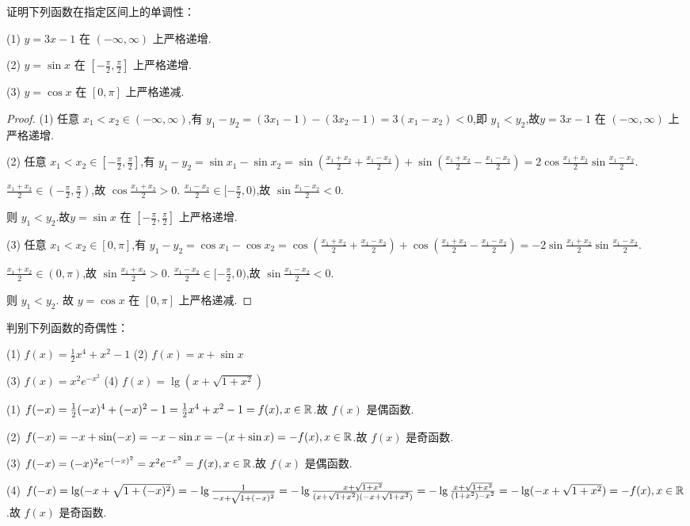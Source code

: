 \begin{practice}
    证明下列函数在指定区间上的单调性：

    (1) $y=3x-1$ 在 $(-\infty,\infty)$ 上严格递增.

    (2) $y=\sin x$ 在 $[-\frac{\pi}{2},\frac{\pi}{2}]$ 上严格递增.

    (3) $y=\cos x$ 在 $[0,\pi]$ 上严格递减.
\end{practice}

\begin{proof}
    (1) 任意 $x_1<x_2\in (-\infty,\infty)$,有 $y_1-y_2=(3x_1-1)-(3x_2-1)=3(x_1-x_2)<0$,即 $y_1<y_2$,故$y=3x-1$ 在 $(-\infty,\infty)$ 上严格递增.

    (2) 任意 $x_1<x_2\in [-\frac{\pi}{2},\frac{\pi}{2}]$,有 $y_1-y_2=\sin x_1-\sin x_2=\sin (\frac{x_1+x_2}{2}+\frac{x_1-x_2}{2})+\sin (\frac{x_1+x_2}{2}-\frac{x_1-x_2}{2})=2 \cos \frac{x_1+x_2}{2}\sin \frac{x_1-x_2}{2}$.
    
    $\frac{x_1+x_2}{2}\in (-\frac{\pi}{2},\frac{\pi}{2})$,故 $\cos \frac{x_1+x_2}{2}>0$. $\frac{x_1-x_2}{2}\in [-\frac{\pi}{2},0)$,故 $\sin \frac{x_1-x_2}{2}<0$. 

    则 $y_1<y_2$.故$y=\sin x$ 在 $[-\frac{\pi}{2},\frac{\pi}{2}]$ 上严格递增.
    
    (3) 任意 $x_1<x_2\in [0,\pi]$,有 $y_1-y_2=\cos x_1-\cos x_2 = \cos (\frac{x_1+x_2}{2}+\frac{x_1-x_2}{2})+\cos (\frac{x_1+x_2}{2}-\frac{x_1-x_2}{2})=-2 \sin \frac{x_1+x_2}{2}\sin \frac{x_1-x_2}{2}$.

    $\frac{x_1+x_2}{2}\in (0,\pi)$,故 $\sin \frac{x_1+x_2}{2}>0$. $\frac{x_1-x_2}{2}\in [-\frac{\pi}{2},0)$,故 $\sin \frac{x_1-x_2}{2}<0$. 

    则 $y_1<y_2$. 故 $y=\cos x$ 在 $[0,\pi]$ 上严格递减.
\end{proof}

\begin{practice}
    判别下列函数的奇偶性：

    (1) $f(x)=\frac{1}{2} x^4 +x^2-1$ \quad (2) $f(x)=x+\sin x$

    (3) $f(x)=x^2e^{-x^2}$ \quad (4) $f(x)=\lg (x+\sqrt{1+x^2})$
\end{practice}

\begin{solve}
    (1) $f(-x)=\frac{1}{2} (-x)^4 +(-x)^2-1=\frac{1}{2} x^4 +x^2-1=f(x),x\in \mathbb{R}$.故 $f(x)$ 是偶函数.

    (2) $f(-x)=-x+\sin(-x)=-x-\sin x=-(x+\sin x)=-f(x),x\in \mathbb{R}$.故 $f(x)$ 是奇函数.

    (3) $f(-x)=(-x)^2e^{-(-x)^2}=x^2e^{-x^2}=f(x),x\in \mathbb{R}$.故 $f(x)$ 是偶函数.

    (4) $f(-x)=\lg (-x+\sqrt{1+(-x)^2})=-\lg \frac{1}{-x+\sqrt{1+(-x)^2}}=-\lg \frac{x+\sqrt{1+x^2}}{(x+\sqrt{1+x^2})(-x+\sqrt{1+x^2})}=-\lg \frac{x+\sqrt{1+x^2}}{(1+x^2)-x^2}=-\lg (-x+\sqrt{1+x^2})=-f(x),x\in \mathbb{R}$.故 $f(x)$ 是奇函数.
    
\end{solve}

